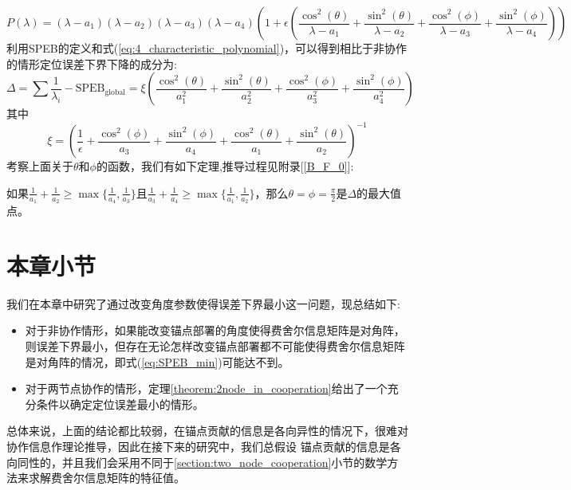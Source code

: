 \begin{equation}\label{eq:4_characteristic_polynomial}
P(\lambda)= (\lambda-a_1)(\lambda-a_2)(\lambda-a_3)(\lambda-a_4)(1+\epsilon(\frac{\cos^2(\theta)}{\lambda-a_1}+
 \frac{\sin^2(\theta)}{\lambda-a_2}+\frac{\cos^2(\phi)}{\lambda-a_3}+\frac{\sin^2(\phi)}{\lambda-a_4}))
\end{equation}
利用SPEB的定义和式(\ref{eq:4_characteristic_polynomial})，可以得到相比于非协作的情形定位误差下界下降的成分为:
\begin{equation}
\Delta=\sum \frac{1}{\lambda_i}-\text{SPEB}_{\text{global}}=\xi\left(\frac{\cos^2(\theta)}{a_1^2}+\frac{\sin^2(\theta)}{a_2^2}+\frac{\cos^2(\phi)}{a_3^2}+\frac{\sin^2(\phi)}{a_4^2}\right)
\end{equation}
其中
\begin{equation}
\xi=\left(\frac{1}{\epsilon}+\frac{\cos^2(\phi)}{a_3}+\frac{\sin^2(\phi)}{a_4}+\frac{\cos^2(\theta)}{a_1}+\frac{\sin^2(\theta)}{a_2}\right)^{-1}
\end{equation}
考察上面关于$\theta$和$\phi$的函数，我们有如下定理,推导过程见附录[\ref{B_F_0}]:
\begin{theorem}\label{theorem:2node_in_cooperation}
如果$\frac{1}{a_1}+\frac{1}{a_2}\geq \max\{\frac{1}{a_4},\frac{1}{a_3}\}$且$\frac{1}{a_3}+\frac{1}{a_4}\geq\max\{\frac{1}{a_1},\frac{1}{a_2}\}$，那么$\theta=\phi=\frac{\pi}{2}$是$\Delta$的最大值点。
\end{theorem}
\section{本章小节}\label{section:conclusion3}
  我们在本章中研究了通过改变角度参数使得误差下界最小这一问题，现总结如下:
  \begin{itemize}
  \item 对于非协作情形，如果能改变锚点部署的角度使得费舍尔信息矩阵是对角阵，则误差下界最小，但存在无论怎样改变锚点部署都不可能使得费舍尔信息矩阵是对角阵的情况，即式(\ref{eq:SPEB_min})可能达不到。
  \item 对于两节点协作的情形，定理\ref{theorem:2node_in_cooperation}给出了一个充分条件以确定定位误差最小的情形。
  \end{itemize}
  总体来说，上面的结论都比较弱，在锚点贡献的信息是各向异性的情况下，很难对协作信息作理论推导，因此在接下来的研究中，我们总假设
  锚点贡献的信息是各向同性的，并且我们会采用不同于\ref{section:two_node_cooperation}小节的数学方法来求解费舍尔信息矩阵的特征值。
